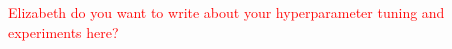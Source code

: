 \textcolor{red}{Elizabeth do you want to write about your hyperparameter tuning and experiments here?}